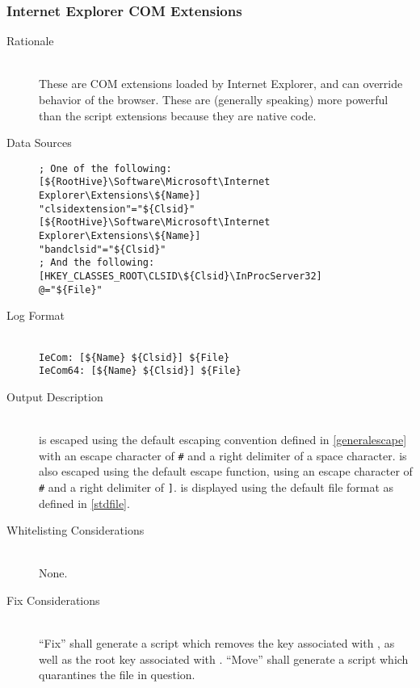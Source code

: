 \subsubsection{Internet Explorer COM Extensions}
\begin{description}
\item[Rationale] \hfill \\
These are COM extensions loaded by Internet Explorer, and can override
behavior of the browser. These are (generally speaking) more powerful than the
script extensions because they are native code.
\item[Data Sources] \hfill
\begin{verbatim}
; One of the following:
[${RootHive}\Software\Microsoft\Internet Explorer\Extensions\${Name}]
"clsidextension"="${Clsid}"
[${RootHive}\Software\Microsoft\Internet Explorer\Extensions\${Name}]
"bandclsid"="${Clsid}"
; And the following:
[HKEY_CLASSES_ROOT\CLSID\${Clsid}\InProcServer32]
@="${File}"
\end{verbatim}
\item[Log Format] \hfill \\
\verb|IeCom: [${Name} ${Clsid}] ${File}| \\
\verb|IeCom64: [${Name} ${Clsid}] ${File}|
\item[Output Description] \hfill \\
 is escaped using the default escaping convention defined in
\ref{generalescape} with an escape character of \verb|#| and a right delimiter
of a space character.  is also escaped using the default escape
function, using an escape character of \verb|#| and a right delimiter of \verb|]|.
 is displayed using the default file format as defined in
\ref{stdfile}.
\item[Whitelisting Considerations] \hfill \\
None.
\item[Fix Considerations] \hfill \\
``Fix'' shall generate a script which removes the key associated with
, as well as the root key associated with .
``Move'' shall generate a script which quarantines the file in question.
\end{description}

